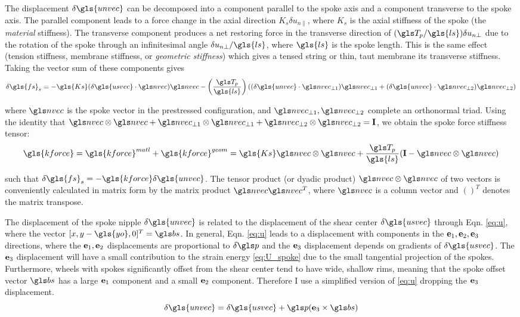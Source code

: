 \documentclass[\rootdir/thesis.tex]{subfiles}
\begin{document}
The displacement $\delta\gls{unvec}$ can be decomposed into a component parallel to the spoke axis and a component transverse to the spoke axis. The parallel component leads to a force change in the axial direction $K_s \delta u_{n\parallel}$, where $K_s$ is the axial stiffness of the spoke (the \emph{material} stiffness). The transverse component produces a net restoring force in the transverse direction of $(\T_p/\gls{ls}) \delta u_{n\perp}$ due to the rotation of the spoke through an infinitesimal angle $\delta u_{n\perp}/\gls{ls}$, where $\gls{ls}$ is the spoke length. This is the same effect (tension stiffness, membrane stiffness, or \emph{geometric stiffness}) which gives a tensed string or thin, taut membrane its transverse stiffness. Taking the vector sum of these components gives
\begin{equation}
\label{eq:fs_us}
\delta\gls{fs}_s =
    -\gls{Ks} (\delta\gls{usvec} \cdot \n)\n -
    \left(\frac{\T_p}{\gls{ls}}\right) \left((\delta\gls{unvec} \cdot \npo) \npo +
                                             (\delta\gls{unvec} \cdot \npt) \npt \right)
\end{equation}

where $\n$ is the spoke vector in the prestressed configuration, and $\npo,\npt$ complete an orthonormal triad. Using the identity that $\n\otimes\n + \npo\otimes\npo + \npt\otimes\npt = \mathbf{I}$, we obtain the spoke force stiffness tensor:
\begin{equation}
\label{eq:kf}
\gls{kforce} = \matl{\gls{kforce}} + \geom{\gls{kforce}} = \gls{Ks} \n\otimes\n + \frac{\T_p}{\gls{ls}}(\mathbf{I} - \n\otimes\n)
\end{equation}

such that $\delta\gls{fs}_s=-\gls{kforce} \delta\gls{unvec}$. The tensor product (or dyadic product) $\n\otimes\n$ of two vectors is conveniently calculated in matrix form by the matrix product $\n\n^T$, where $\n$ is a column vector  and $()^T$ denotes the matrix transpose.

The displacement of the spoke nipple $\delta\gls{unvec}$ is related to the displacement of the shear center $\delta\gls{usvec}$ through Eqn. \eqref{eq:u}, where the vector $[\x,\y-\gls{yo},0]^T = \bs$. In general, Eqn. \eqref{eq:u} leads to a displacement with components in the $\mathbf{e}_1,\mathbf{e}_2,\mathbf{e}_3$ directions, where the $\mathbf{e}_1,\mathbf{e}_2$ displacements are proportional to $\delta\p$ and the $\mathbf{e}_3$ displacement depends on gradients of $\delta\gls{usvec}$. The $\mathbf{e}_3$ displacement will have a small contribution to the strain energy \eqref{eq:U_spoke} due to the small tangential projection of the spokes. Furthermore, wheels with spokes significantly offset from the shear center tend to have wide, shallow rims, meaning that the spoke offset vector $\bs$ has a large $\mathbf{e}_1$ component and a small $\mathbf{e}_2$ component. Therefore I use a simplified version of \eqref{eq:u} dropping the $\mathbf{e}_3$ displacement.
\begin{equation}
\label{eq:un_us}
\delta\gls{unvec} = \delta\gls{usvec} + \p (\eh \times \bs)
\end{equation}
\end{document}
